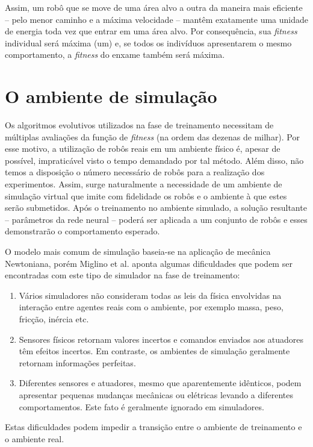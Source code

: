 Assim, um robô que se move de uma área alvo a outra da maneira mais eficiente -- pelo menor caminho e a máxima velocidade -- mantêm exatamente uma unidade de energia toda vez que entrar em uma área alvo. Por consequência, sua \textit{fitness} individual será máxima (um) e, se todos os indivíduos apresentarem o mesmo comportamento, a \textit{fitness} do enxame também será máxima.

\section{O ambiente de simulação}
\label{sec:simulation}

Os algoritmos evolutivos utilizados na fase de treinamento necessitam de múltiplas avaliações da função de \textit{fitness} (na ordem das dezenas de milhar). Por esse motivo, a utilização de robôs reais em um ambiente físico é, apesar de possível, impraticável visto o tempo demandado por tal método. Além disso, não temos a disposição o número necessário de robôs para a realização dos experimentos. Assim, surge naturalmente a necessidade de um ambiente de simulação virtual que imite com fidelidade os robôs e o ambiente à que estes serão submetidos. Após o treinamento no ambiente simulado, a solução resultante -- parâmetros da rede neural -- poderá ser aplicada a um conjunto de robôs e esses demonstrarão o comportamento esperado.

O modelo mais comum de simulação baseia-se na aplicação de mecânica Newtoniana, porém Miglino et al. \cite{miglino1996evolving} aponta algumas dificuldades que podem ser encontradas com este tipo de simulador na fase de treinamento:
\begin{enumerate}
    \item Vários simuladores não consideram todas as leis da física envolvidas na interação entre agentes reais com o ambiente, por exemplo massa, peso, fricção, inércia etc.
    \item Sensores físicos retornam valores incertos e comandos enviados aos atuadores têm efeitos incertos. Em contraste, os ambientes de simulação geralmente retornam informações perfeitas.
    \item Diferentes sensores e atuadores, mesmo que aparentemente idênticos, podem apresentar pequenas mudanças mecânicas ou elétricas levando a diferentes comportamentos. Este fato é geralmente ignorado em simuladores.
\end{enumerate}

Estas dificuldades podem impedir a transição entre o ambiente de treinamento e o ambiente real.

